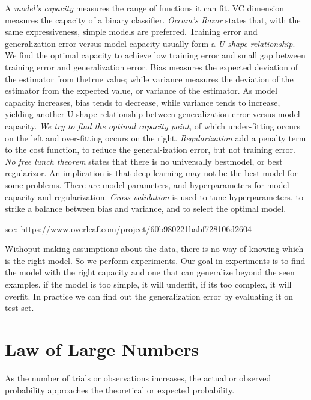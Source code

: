 \documentclass[openany]{book}
\begin{document}
A \textit{model’s capacity} measures the range of functions it can fit. VC dimension measures the capacity of a binary classifier.  \textit{Occam’s Razor} states that, with the same expressiveness, simple models are preferred.  Training error and generalization error versus model capacity usually form a \textit{U-shape relationship}. We find the optimal capacity to achieve low training error and small gap between training error and generalization error.  Bias measures the expected deviation of the estimator from thetrue value; while variance measures the deviation of the estimator from the expected value, or variance of the estimator.  As model capacity increases, bias tends to decrease, while variance tends to increase, yielding another U-shape relationship between generalization error versus model capacity. \textit{We try to find the optimal capacity point}, of which under-fitting occurs on the left and over-fitting occurs on the right. \textit{ Regularization } add a penalty term to the cost function, to reduce the general-ization error, but not training error.  \textit{No free lunch theorem} states that there is no universally bestmodel, or best regularizor. An implication is that deep learning may not be the best model for some problems. There are model parameters, and hyperparameters for model capacity and regularization. \textit{Cross-validation} is used to tune hyperparameters, to strike a balance between bias and variance, and to select the optimal model. 

see: 
https://www.overleaf.com/project/60b980221babf728106d2604 



Withoput making assumptions about the data, there is no way of knowing which is the right model. So we perform experiments. Our goal in experiments is to find the model with the right capacity and one that can generalize beyond the seen examples. if the model is too simple, it will underfit, if its too complex, it will overfit. In practice we can find out the generalization error by evaluating it on test set. 



\section{Law of Large Numbers}

 As the number of trials or observations increases, the actual or observed probability approaches the theoretical or expected probability.
\end{document}
